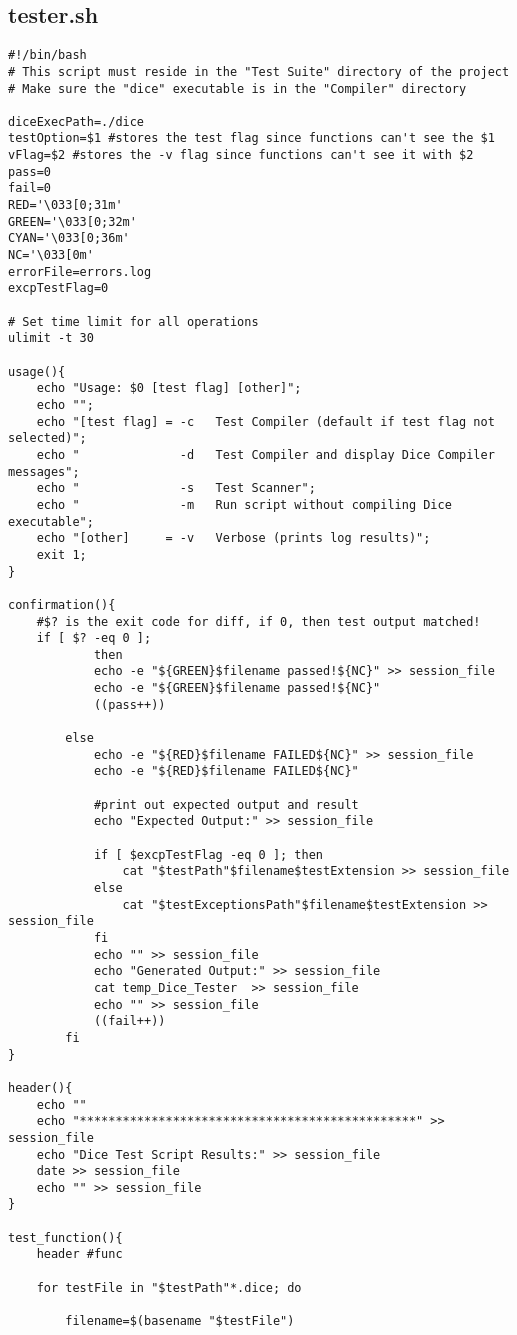 \subsection{tester.sh}
\begin{verbatim}
#!/bin/bash
# This script must reside in the "Test Suite" directory of the project
# Make sure the "dice" executable is in the "Compiler" directory

diceExecPath=./dice
testOption=$1 #stores the test flag since functions can't see the $1
vFlag=$2 #stores the -v flag since functions can't see it with $2
pass=0
fail=0
RED='\033[0;31m'
GREEN='\033[0;32m'
CYAN='\033[0;36m'
NC='\033[0m'
errorFile=errors.log
excpTestFlag=0

# Set time limit for all operations
ulimit -t 30

usage(){
	echo "Usage: $0 [test flag] [other]";
	echo "";
	echo "[test flag] = -c   Test Compiler (default if test flag not selected)";
	echo "              -d   Test Compiler and display Dice Compiler messages";
	echo "              -s   Test Scanner";
	echo "              -m   Run script without compiling Dice executable";
	echo "[other]     = -v   Verbose (prints log results)";
	exit 1;
}

confirmation(){
	#$? is the exit code for diff, if 0, then test output matched!
	if [ $? -eq 0 ];
			then
			echo -e "${GREEN}$filename passed!${NC}" >> session_file
			echo -e "${GREEN}$filename passed!${NC}"
			((pass++))

		else
			echo -e "${RED}$filename FAILED${NC}" >> session_file
			echo -e "${RED}$filename FAILED${NC}"

			#print out expected output and result
			echo "Expected Output:" >> session_file
			
			if [ $excpTestFlag -eq 0 ];	then
				cat "$testPath"$filename$testExtension >> session_file
			else
				cat "$testExceptionsPath"$filename$testExtension >> session_file
			fi
			echo "" >> session_file
			echo "Generated Output:" >> session_file
			cat temp_Dice_Tester  >> session_file
			echo "" >> session_file
			((fail++))
		fi
}

header(){
	echo ""
	echo "***********************************************" >> session_file
	echo "Dice Test Script Results:" >> session_file
	date >> session_file
	echo "" >> session_file
}

test_function(){
	header #func

	for testFile in "$testPath"*.dice; do

		filename=$(basename "$testFile")


\end{verbatim}
